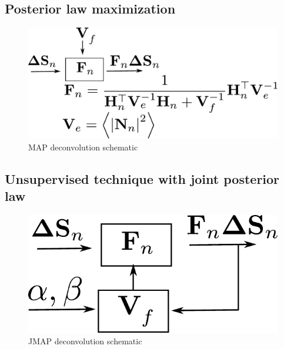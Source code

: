 \documentclass[english]{article}
\begin{document}
\subsection{Posterior law maximization}



\begin{figure}[H]
\centering
\includegraphics[scale = 0.5]{MAP_deconvolution}
\caption{MAP deconvolution schematic}
\label{fig: MAP deconvolution}
\end{figure}




\subsection{Unsupervised technique with joint posterior law}


\begin{figure}[H]
\centering
\includegraphics[scale = 0.5]{JMAP_deconvolution}
\caption{JMAP deconvolution schematic}
\label{fig: JMAP deconvolution}
\end{figure}
\end{document}
